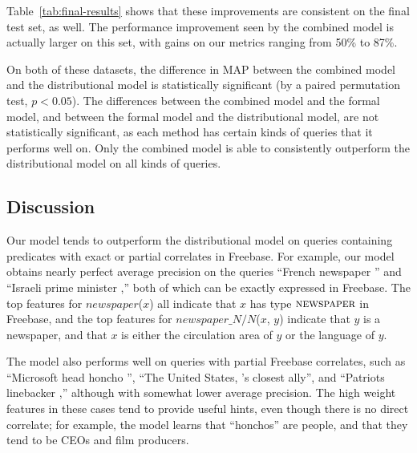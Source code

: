 \documentclass[11pt,letterpaper]{article}
\newcommand{\tabref}[1]{Table~\ref{tab:#1}}
\newcommand{\blank}{\underline{\hspace{.5cm}}}
\newcommand{\lexicalpredicate}[1]{\ensuremath{\textit{#1}}}
\newcommand{\formalpredicate}[1]{{\small \ensuremath{\textsc{#1}}}}
\begin{document}
\tabref{final-results} shows that these improvements are consistent on the
final test set, as well.  The performance improvement seen by the combined
model is actually larger on this set, with gains on our metrics ranging from
50\% to 87\%.

On both of these datasets, the difference in MAP between the combined model and
the distributional model is statistically significant (by a paired permutation
test, $p < 0.05$).  The differences between the combined model and the formal
model, and between the formal model and the distributional model, are not
statistically significant, as each method has certain kinds of queries that it
performs well on.  Only the combined model is able to consistently outperform
the distributional model on all kinds of queries.

\subsection{Discussion}

Our model tends to outperform the distributional model on queries containing
predicates with exact or partial correlates in Freebase. For example, our model
obtains nearly perfect average precision on the queries ``French newspaper
\blank{}'' and ``Israeli prime minister \blank{},'' both of which can be
exactly expressed in Freebase.  The top features for
\lexicalpredicate{newspaper}($x$) all indicate that $x$ has type
\formalpredicate{newspaper} in Freebase, and the top features for
\lexicalpredicate{newspaper\_N/N}($x$, $y$) indicate that $y$ is a newspaper,
and that $x$ is either the circulation area of $y$ or the language of $y$.

The model also performs well on queries with partial Freebase correlates, such
as ``Microsoft head honcho \blank{}'', ``The United States, \blank{}'s closest
ally'', and ``Patriots linebacker \blank{},'' although with somewhat lower
average precision. The high weight features in these cases tend to provide
useful hints, even though there is no direct correlate; for example, the model
learns that ``honchos'' are people, and that they tend to be CEOs and film
producers.
\end{document}
